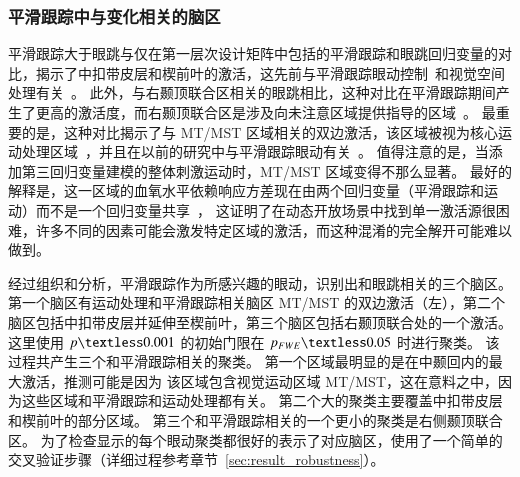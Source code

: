 \subsubsection{平滑跟踪中与变化相关的脑区}
平滑跟踪大于眼跳与仅在第一层次设计矩阵中包括的平滑跟踪和眼跳回归变量的对比，揭示了中扣带皮层和楔前叶的激活，这先前与平滑跟踪眼动控制~\cite{tanabe2002brain,kimmig2008fmri}和视觉空间处理有关~\cite{berman1999cortical,e2006the}。
此外，与右颞顶联合区相关的眼跳相比，这种对比在平滑跟踪期间产生了更高的激活度，而右颞顶联合区是涉及向未注意区域提供指导的区域~\cite{corbetta2000voluntary,wu2015a,marsman2016a}。
最重要的是，这种对比揭示了与 MT/MST 区域相关的双边激活，该区域被视为核心运动处理区域~\cite{petit1999functional,lencer2008neurophysiology,nagel2006parametric}，并且在以前的研究中与平滑跟踪眼动有关~\cite{kimmig2008fmri,ohlendorf2010visual,marsman2016a}。 
值得注意的是，当添加第三回归变量建模的整体刺激运动时，MT/MST 区域变得不那么显著。 
最好的解释是，这一区域的血氧水平依赖响应方差现在由两个回归变量（平滑跟踪和运动）而不是一个回归变量共享~\cite{ohlendorf2010visual}，
这证明了在动态开放场景中找到单一激活源很困难，许多不同的因素可能会激发特定区域的激活，而这种混淆的完全解开可能难以做到。

经过组织和分析，平滑跟踪作为所感兴趣的眼动，识别出和眼跳相关的三个脑区。
第一个脑区有运动处理和平滑跟踪相关脑区 MT/MST 的双边激活（左），第二个脑区包括中扣带皮层并延伸至楔前叶，第三个脑区包括右颞顶联合处的一个激活。
这里使用 $p\textless0.001$ 的初始门限在 $p_{FWE}\textless0.05$ 时进行聚类。
该过程共产生三个和平滑跟踪相关的聚类。
第一个区域最明显的是在中颞回内的最大激活，推测可能是因为 该区域包含视觉运动区域 MT/MST，这在意料之中，因为这些区域和平滑跟踪和运动处理都有关。
第二个大的聚类主要覆盖中扣带皮层和楔前叶的部分区域。
第三个和平滑跟踪相关的一个更小的聚类是右侧颞顶联合区。
为了检查显示的每个眼动聚类都很好的表示了对应脑区，使用了一个简单的交叉验证步骤（详细过程参考章节~\ref{sec:result_robustness}）。



